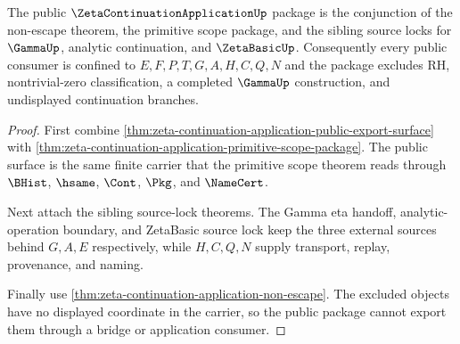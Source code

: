\begin{theorem}
\label{thm:zeta-continuation-application-public-nonescape-package}
The public $\ZetaContinuationApplicationUp$ package is the conjunction of the non-escape theorem, the primitive scope package, and the sibling source locks for $\GammaUp$, analytic continuation, and $\ZetaBasicUp$. Consequently every public consumer is confined to $E,F,P,T,G,A,H,C,Q,N$ and the package excludes RH, nontrivial-zero classification, a completed $\GammaUp$ construction, and undisplayed continuation branches.
\end{theorem}
\begin{proof}
First combine \autoref{thm:zeta-continuation-application-public-export-surface} with \autoref{thm:zeta-continuation-application-primitive-scope-package}. The public surface is the same finite carrier that the primitive scope theorem reads through $\BHist$, $\hsame$, $\Cont$, $\Pkg$, and $\NameCert$.

Next attach the sibling source-lock theorems. The Gamma eta handoff, analytic-operation boundary, and ZetaBasic source lock keep the three external sources behind $G,A,E$ respectively, while $H,C,Q,N$ supply transport, replay, provenance, and naming.

Finally use \autoref{thm:zeta-continuation-application-non-escape}. The excluded objects have no displayed coordinate in the carrier, so the public package cannot export them through a bridge or application consumer.
\end{proof}

